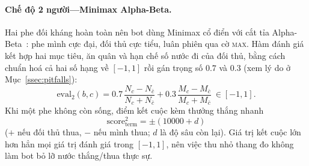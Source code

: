 \paragraph{Chế độ 2 người---Minimax Alpha-Beta.} Hai phe đối kháng hoàn
toàn nên bot dùng Minimax cổ điển với cắt tỉa
Alpha-Beta~\citep{knuth1975alphabeta}: phe mình cực đại, đối thủ cực tiểu, luân
phiên qua cờ \textsc{max}. Hàm đánh giá kết hợp hai mục tiêu, ăn quân và hạn chế
số nước đi của đối thủ, bằng cách chuẩn hoá cả hai
số hạng về $[-1,1]$ rồi gán trọng số $0.7$ và $0.3$
(xem lý do ở Mục~\ref{ssec:pitfalls}):
\begin{equation}
\mathrm{eval}_2(b,c)=0.7\,\frac{N_c-N_{\bar c}}{N_c+N_{\bar c}}
+0.3\,\frac{M_c-M_{\bar c}}{M_c+M_{\bar c}}\ \in[-1,1].
\label{eq:eval}
\end{equation}
Khi một phe không còn sống, điểm kết cuộc kèm thưởng thắng nhanh
\begin{equation}
\mathrm{score}^{2}_{\text{term}}=\pm(10000+d)
\label{eq:term2}
\end{equation}
($+$ nếu đối thủ thua, $-$ nếu mình thua; $d$ là độ sâu còn lại). Giá trị
kết cuộc lớn hơn hẳn mọi giá trị đánh giá trong $[-1,1]$, nên việc thu nhỏ thang đo không
làm bot bỏ lỡ nước thắng/thua thực sự.

